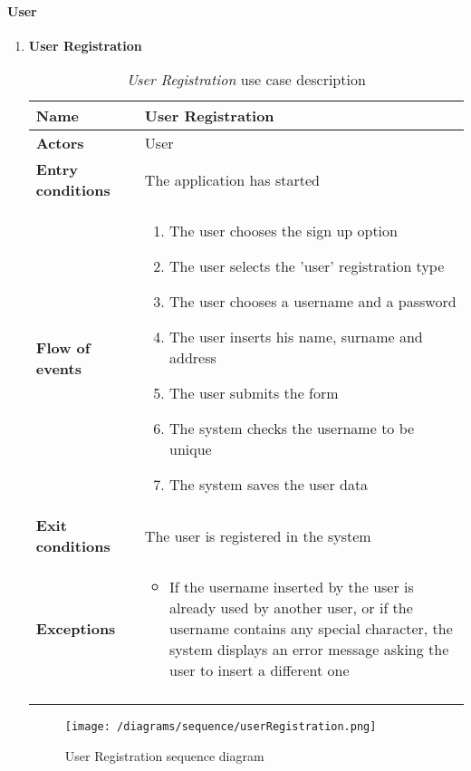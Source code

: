 		\paragraph{User}
		\begin{enumerate}
			\item \textbf{User Registration} 
				\begin{longtable}{p{0.25\linewidth}p{0.75\linewidth}}
					\toprule
					\textbf{Name} & \textbf{User Registration} \\
					\midrule
					\textbf{Actors} & User \\
					\midrule
					\textbf{Entry conditions} & The application has started \\
					\midrule
					\textbf{Flow of events} & 
					\begin{enumerate}
						\item The user chooses the sign up option
						\item The user selects the 'user' registration type
						\item The user chooses a username and a password
						\item The user inserts his name, surname and address
						\item The user submits the form
						\item The system checks the username to be unique
						\item The system saves the user data
					\end{enumerate} \\
					\midrule
					\textbf{Exit conditions} & The user is registered in the system\\
					\midrule
					\textbf{Exceptions} & 
					\begin{itemize}
						\item If the username inserted by the user is already used by another user, or if the username contains any special character, the system displays an error message asking the user to insert a different one
					\end{itemize} \\
					\bottomrule
					\caption{\emph{User Registration} use case description}
				\end{longtable}
			
				\begin{figure}[h]
					\centering
					\texttt{[image: /diagrams/sequence/userRegistration.png]}
					\caption{User Registration sequence diagram}
				\end{figure}
				

\end{enumerate}
